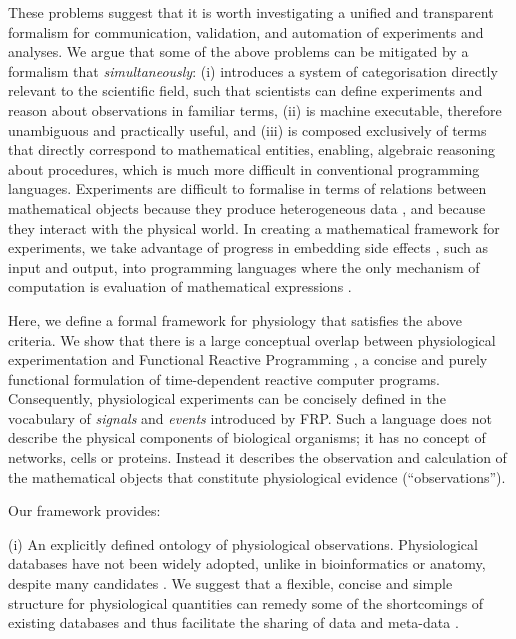 These problems suggest that it is worth investigating a
unified and transparent formalism for communication, validation, and
automation of experiments and analyses. We argue that
some of the above problems can be mitigated by a formalism that
\emph{simultaneously}: (i) introduces a system of categorisation
directly relevant to the scientific field, such that scientists can
define experiments and reason about observations in familiar terms,
(ii) is machine executable, therefore unambiguous and practically
useful, and (iii) is composed exclusively of terms that directly
correspond to mathematical entities, enabling, algebraic reasoning
about procedures, which is much more difficult in conventional
programming languages.  Experiments are difficult to formalise in
terms of relations between mathematical objects because they produce
heterogeneous data \citep{Tukey1962}, and because they interact with
the physical world. In creating a mathematical framework for
experiments, we take advantage of progress in embedding side effects
\citep{PeytonJones2002, Roy2004, Wadler1995}, such as input and output,
into programming languages where the only mechanism of computation is
evaluation of mathematical expressions \citep{Church1941}.

Here, we define a formal framework for physiology
that satisfies the above criteria. We show that there
is a large conceptual overlap between physiological experimentation
and Functional Reactive Programming \citep[FRP; ][]{Elliott1997,
  Nilsson2002}, a concise and purely functional formulation of
time-dependent reactive computer programs. Consequently, physiological
experiments can be concisely defined in the vocabulary of
\emph{signals} and \emph{events} introduced by FRP. Such a language
does not describe the physical components of biological organisms; it
has no concept of networks, cells or proteins. Instead it describes
the observation and calculation of the mathematical objects that
constitute physiological evidence (``observations'').

Our framework provides:

(i) An explicitly defined ontology of physiological
observations. Physiological databases have not been widely
adopted\citep{Herz2008, Amari2002}, unlike in bioinformatics or
anatomy, despite many candidates \citep{Jessop2010, Teeters2008,
  Frishkoff2009, Katz2010}.  We suggest that a flexible, concise and
simple structure for physiological quantities can remedy some of the
shortcomings\citep{Gardner2005, Amari2002} of existing databases and
thus facilitate the sharing of data and meta-data \citep{Insel2003}.

